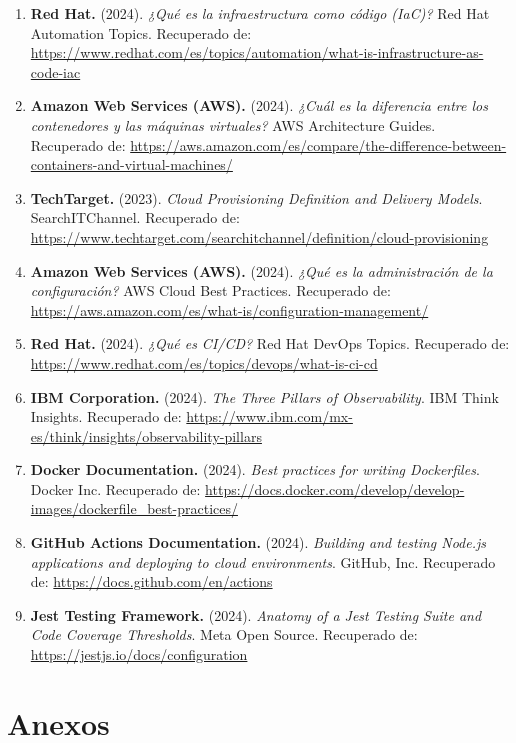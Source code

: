 \documentclass[12pt,letterpaper]{article}
\begin{document}
\begin{enumerate}
    \item \textbf{Red Hat.} (2024). \emph{¿Qué es la infraestructura como código (IaC)?} Red Hat Automation Topics. Recuperado de: \url{https://www.redhat.com/es/topics/automation/what-is-infrastructure-as-code-iac}
    \item \textbf{Amazon Web Services (AWS).} (2024). \emph{¿Cuál es la diferencia entre los contenedores y las máquinas virtuales?} AWS Architecture Guides. Recuperado de: \url{https://aws.amazon.com/es/compare/the-difference-between-containers-and-virtual-machines/}
    \item \textbf{TechTarget.} (2023). \emph{Cloud Provisioning Definition and Delivery Models}. SearchITChannel. Recuperado de: \url{https://www.techtarget.com/searchitchannel/definition/cloud-provisioning}
    \item \textbf{Amazon Web Services (AWS).} (2024). \emph{¿Qué es la administración de la configuración?} AWS Cloud Best Practices. Recuperado de: \url{https://aws.amazon.com/es/what-is/configuration-management/}
    \item \textbf{Red Hat.} (2024). \emph{¿Qué es CI/CD?} Red Hat DevOps Topics. Recuperado de: \url{https://www.redhat.com/es/topics/devops/what-is-ci-cd}
    \item \textbf{IBM Corporation.} (2024). \emph{The Three Pillars of Observability}. IBM Think Insights. Recuperado de: \url{https://www.ibm.com/mx-es/think/insights/observability-pillars}
    \item \textbf{Docker Documentation.} (2024). \emph{Best practices for writing Dockerfiles}. Docker Inc. Recuperado de: \url{https://docs.docker.com/develop/develop-images/dockerfile_best-practices/}
    \item \textbf{GitHub Actions Documentation.} (2024). \emph{Building and testing Node.js applications and deploying to cloud environments}. GitHub, Inc. Recuperado de: \url{https://docs.github.com/en/actions}
    \item \textbf{Jest Testing Framework.} (2024). \emph{Anatomy of a Jest Testing Suite and Code Coverage Thresholds}. Meta Open Source. Recuperado de: \url{https://jestjs.io/docs/configuration}
\end{enumerate}

\newpage

\section{Anexos}
\end{document}
